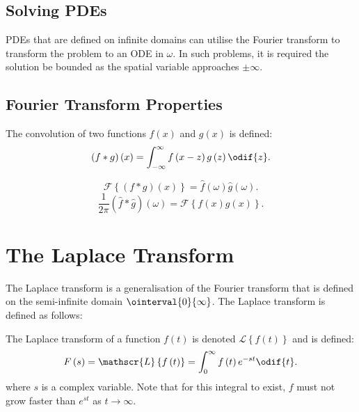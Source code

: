 \documentclass{article}
\begin{document}
\subsection{Solving PDEs}
PDEs that are defined on infinite domains can utilise the Fourier
transform to transform the problem to an ODE in \(\omega\). In such
problems, it is required the solution be bounded as the spatial
variable approaches \(\pm \infty\).
\subsection{Fourier Transform Properties}
\begin{definition}[Convolution]
    The convolution of two functions \(f\left( x \right)\) and \(g\left( x \right)\) is defined:
    \begin{equation*}
        \left( f \ast g \right)\left( x \right) = \int_{-\infty}^\infty f\left( x - z \right) g\left( z \right) \odif{z}.
    \end{equation*}
\end{definition}
\begin{theorem}
    \begin{equation*}
        \mathscr{F}\left\{ \left( f \ast g \right)\left( x \right) \right\} = \hat{f}\left( \omega \right) \hat{g}\left( \omega \right).
    \end{equation*}
    \begin{equation*}
        \frac{1}{2\pi} \left( \hat{f} \ast \hat{g} \right)\left( \omega \right) = \mathscr{F}\left\{ f\left( x \right) g\left( x \right) \right\}.
    \end{equation*}
\end{theorem}
\section{The Laplace Transform}
The Laplace transform is a generalisation of the Fourier transform that
is defined on the semi-infinite domain \(\ointerval{0}{\infty}\). The
Laplace transform is defined as follows:
\begin{definition}
    The Laplace transform of a function \(f\left( t \right)\) is denoted
    \(\mathscr{L}\left\{ f\left( t \right) \right\}\) and is defined:
    \begin{equation*}
        F\left( s \right) = \mathscr{L}\left\{ f\left( t \right) \right\} = \int_0^\infty f\left( t \right) e^{-st} \odif{t}.
    \end{equation*}
    where \(s\) is a complex variable. Note that for this integral to
    exist, \(f\) must not grow faster than \(e^{st}\) as \(t \to \infty\).
\end{definition}
\end{document}
